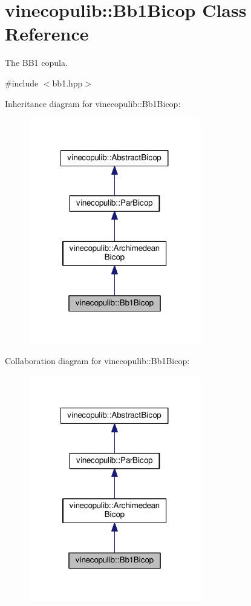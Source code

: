 \hypertarget{classvinecopulib_1_1_bb1_bicop}{\section{vinecopulib\+:\+:Bb1\+Bicop Class Reference}
\label{classvinecopulib_1_1_bb1_bicop}
}


The B\+B1 copula.  




{\ttfamily \#include $<$bb1.\+hpp$>$}



Inheritance diagram for vinecopulib\+:\+:Bb1\+Bicop\+:\nopagebreak
\begin{figure}[H]
\begin{center}
\leavevmode
\includegraphics[width=212pt]{classvinecopulib_1_1_bb1_bicop__inherit__graph}
\end{center}
\end{figure}


Collaboration diagram for vinecopulib\+:\+:Bb1\+Bicop\+:\nopagebreak
\begin{figure}[H]
\begin{center}
\leavevmode
\includegraphics[width=212pt]{classvinecopulib_1_1_bb1_bicop__coll__graph}
\end{center}
\end{figure}
